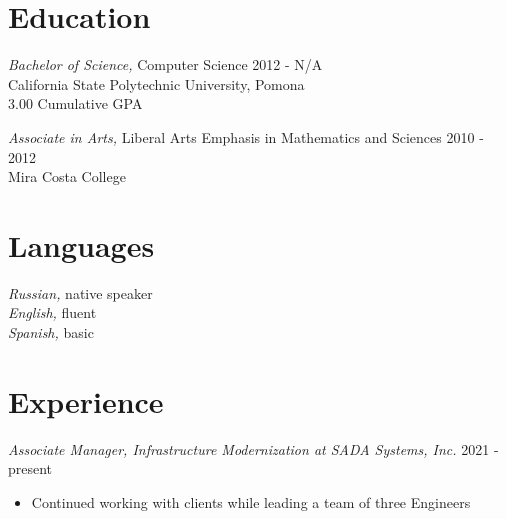 \documentclass[line]{docs/resume/res}
\begin{document}
\address{https://smaslennikov.com}
\address{Email: me@smaslennikov.com}

\begin{resume}

\section{Education}
  {\sl Bachelor of Science,} Computer Science \hfill 2012 - N/A\\
  California State Polytechnic University, Pomona \\
  3.00 Cumulative GPA

  {\sl Associate in Arts,} Liberal Arts Emphasis in Mathematics and Sciences \hfill 2010 - 2012 \\
  Mira Costa College

\section{Languages}
  {\sl Russian,} native speaker \\
  {\sl English,} fluent \\
  {\sl Spanish,} basic

\section{Experience}
  {\sl Associate Manager, Infrastructure Modernization at SADA Systems, Inc.} \hfill 2021 - present
  \begin{itemize} \itemsep -2pt
    \item Continued working with clients while leading a team of three Engineers


\end{itemize}
\end{resume}
\end{document}
